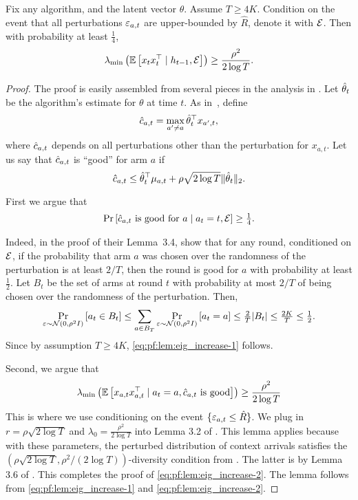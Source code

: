 \begin{lemma}\label{lem:eig_increase}
Fix any \GreedyStyle algorithm, and the latent vector $\theta$. Assume $T \ge 4K$. Condition on the event that all perturbations $\varepsilon_{a,t}$ are upper-bounded by
$\hat R$, denote it with $\mathcal{E}$.
Then with probability at least $\tfrac14$,
  \[
    \lambda_{\min}\left(\mathbb{E}\left[x_t x_t^{\top} \;|\; h_{t-1}, \mathcal{E}\right]\right) \ge \frac{\rho^2}{2\log T}.
  \]
\end{lemma}
\begin{proof}
The proof is easily assembled from several pieces in the analysis in  \citet{kannan2018smoothed}.
Let $\hat{\theta}_t$ be the algorithm's estimate for $\theta$ at time
$t$. As in~\citet{kannan2018smoothed}, define
\[
  \hat{c}_{a,t} = \max_{a' \ne a} \hat{\theta}_t^{\top} x_{a',t},
\]
where $\hat{c}_{a,t}$ depends on all perturbations other than the perturbation for
$x_{a,t}$. Let us say that $\hat{c}_{a,t}$ is ``good'' for arm $a$ if
\[
  \hat{c}_{a,t} \le \hat{\theta}_t^{\top} \mu_{a,t} + \rho \sqrt{2 \log T}
  \|\hat{\theta}_t\|_2.
\]

First we argue that
  \begin{align}\label{eq:pf:lem:eig_increase-1}
    \Pr\left[\hat{c}_{a,t} \text{ is good for } a \;|\; a_t = t, \mathcal{E}\right] \ge \tfrac14.
  \end{align}

Indeed, in the proof of their Lemma~3.4, \citet{kannan2018smoothed} show that for
any round, conditioned on $\mathcal{E}$, if the probability that arm $a$ was chosen over the randomness of the
perturbation is at least $2/T$, then
  the round is good for $a$ with probability at least $\tfrac12$. Let $B_t$ be the set of
  arms at round $t$ with probability at most $2/T$ of being chosen over the
  randomness of the perturbation. Then,
  \[
    \Pr_{\varepsilon \sim \mathcal{N}(0, \rho^2 I)} \left[a_t \in B_t\right] \le \sum_{a \in
    B_T} \Pr_{\varepsilon \sim \mathcal{N}(0, \rho^2 I)} \left[a_t = a\right] \le
    \tfrac{2}{T} |B_t| \le \tfrac{2K}{T} \le \tfrac{1}{2}.
  \]
  Since by assumption $T \ge 4K$, \eqref{eq:pf:lem:eig_increase-1} follows.

Second, we argue that
\begin{align}\label{eq:pf:lem:eig_increase-2}
    \lambda_{\min}\left(\mathbb{E}\left[x_{a,t}x_{a,t}^{\top} \;|\; a_t=a, \hat{c}_{a,t} \text{ is
    good}\right]\right) \ge \frac{\rho^2}{2\log T}
\end{align}
This is where we use conditioning on the event $\{ \varepsilon_{a,t} \leq \hat R\}$. We plug in $r = \rho \sqrt{2 \log T}$ and $\lambda_0 = \frac{\rho^2}{2 \log T}$
into Lemma 3.2 of \citet{kannan2018smoothed}. This lemma applies because with these parameters, the perturbed distribution of context arrivals satisfies the
    $(\rho\sqrt{2 \log T}, \rho^2/(2 \log T))$-diversity
condition from \citet{kannan2018smoothed}. The latter is by
    Lemma 3.6 of \citet{kannan2018smoothed}.
This completes the proof of \eqref{eq:pf:lem:eig_increase-2}. The lemma follows from \eqref{eq:pf:lem:eig_increase-1} and \eqref{eq:pf:lem:eig_increase-2}.
\end{proof}

